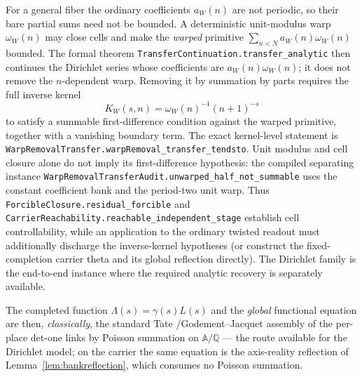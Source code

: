 \documentclass[11pt]{article}
\theoremstyle{definition}
\begin{document}
For a general fiber the ordinary coefficients $a_W(n)$ are not periodic, so their bare partial sums need
not be bounded.  A deterministic unit-modulus warp $\omega_W(n)$ may close cells and make the \emph{warped}
primitive $\sum_{n<N}a_W(n)\omega_W(n)$ bounded.  The formal theorem
\texttt{TransferContinuation.transfer\_analytic} then continues the Dirichlet series whose coefficients are
$a_W(n)\omega_W(n)$; it does not remove the $n$-dependent warp.  Removing it by summation by parts requires
the full inverse kernel
\[
 K_W(s,n)=\omega_W(n)^{-1}(n+1)^{-s}
\]
to satisfy a summable first-difference condition against the warped primitive, together with a vanishing
boundary term.  The exact kernel-level statement is
\texttt{WarpRemovalTransfer.warpRemoval\_transfer\_tendsto}.  Unit modulus and cell closure alone do
not imply its first-difference hypothesis: the compiled separating instance
\texttt{WarpRemovalTransferAudit.unwarped\_half\_not\_summable} uses the constant coefficient bank and the
period-two unit warp.  Thus \texttt{ForcibleClosure.residual\_forcible} and
\texttt{CarrierReachability.reachable\_independent\_stage} establish cell controllability, while an
application to the ordinary twisted readout must additionally discharge the inverse-kernel hypotheses (or
construct the fixed-completion carrier theta and its global reflection directly).  The Dirichlet family is
the end-to-end instance where the required analytic recovery is separately available.

The completed function $\Lambda(s)=\gamma(s)L(s)$ and the \emph{global} functional equation are then,
\emph{classically}, the standard Tate \cite{Tate}/Godement--Jacquet \cite{GJa} assembly of the per-place
det-one links by Poisson summation on $\mathbb A/\mathbb Q$ --- the route available for the Dirichlet model;
on the carrier the same equation is the axis-reality reflection of Lemma~\ref{lem:bankreflection}, which
consumes no Poisson summation.
\end{document}
